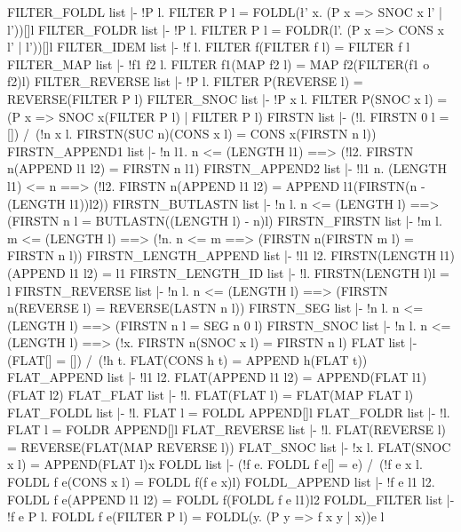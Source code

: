 \THEOREM FILTER\_FOLDL list
|- !P l. FILTER P l = FOLDL(\l' x. (P x => SNOC x l' | l'))[]l
\ENDTHEOREM
\THEOREM FILTER\_FOLDR list
|- !P l. FILTER P l = FOLDR(\x l'. (P x => CONS x l' | l'))[]l
\ENDTHEOREM
\THEOREM FILTER\_IDEM list
|- !f l. FILTER f(FILTER f l) = FILTER f l
\ENDTHEOREM
\THEOREM FILTER\_MAP list
|- !f1 f2 l. FILTER f1(MAP f2 l) = MAP f2(FILTER(f1 o f2)l)
\ENDTHEOREM
\THEOREM FILTER\_REVERSE list
|- !P l. FILTER P(REVERSE l) = REVERSE(FILTER P l)
\ENDTHEOREM
\THEOREM FILTER\_SNOC list
|- !P x l. FILTER P(SNOC x l) = (P x => SNOC x(FILTER P l) | FILTER P l)
\ENDTHEOREM
\THEOREM FIRSTN list
|- (!l. FIRSTN 0 l = []) /\
   (!n x l. FIRSTN(SUC n)(CONS x l) = CONS x(FIRSTN n l))
\ENDTHEOREM
\THEOREM FIRSTN\_APPEND1 list
|- !n l1.
    n <= (LENGTH l1) ==> (!l2. FIRSTN n(APPEND l1 l2) = FIRSTN n l1)
\ENDTHEOREM
\THEOREM FIRSTN\_APPEND2 list
|- !l1 n.
    (LENGTH l1) <= n ==>
    (!l2. FIRSTN n(APPEND l1 l2) = APPEND l1(FIRSTN(n - (LENGTH l1))l2))
\ENDTHEOREM
\THEOREM FIRSTN\_BUTLASTN list
|- !n l. n <= (LENGTH l) ==> (FIRSTN n l = BUTLASTN((LENGTH l) - n)l)
\ENDTHEOREM
\THEOREM FIRSTN\_FIRSTN list
|- !m l.
    m <= (LENGTH l) ==>
    (!n. n <= m ==> (FIRSTN n(FIRSTN m l) = FIRSTN n l))
\ENDTHEOREM
\THEOREM FIRSTN\_LENGTH\_APPEND list
|- !l1 l2. FIRSTN(LENGTH l1)(APPEND l1 l2) = l1
\ENDTHEOREM
\THEOREM FIRSTN\_LENGTH\_ID list
|- !l. FIRSTN(LENGTH l)l = l
\ENDTHEOREM
\THEOREM FIRSTN\_REVERSE list
|- !n l. n <= (LENGTH l) ==> (FIRSTN n(REVERSE l) = REVERSE(LASTN n l))
\ENDTHEOREM
\THEOREM FIRSTN\_SEG list
|- !n l. n <= (LENGTH l) ==> (FIRSTN n l = SEG n 0 l)
\ENDTHEOREM
\THEOREM FIRSTN\_SNOC list
|- !n l. n <= (LENGTH l) ==> (!x. FIRSTN n(SNOC x l) = FIRSTN n l)
\ENDTHEOREM
\THEOREM FLAT list
|- (FLAT[] = []) /\ (!h t. FLAT(CONS h t) = APPEND h(FLAT t))
\ENDTHEOREM
\THEOREM FLAT\_APPEND list
|- !l1 l2. FLAT(APPEND l1 l2) = APPEND(FLAT l1)(FLAT l2)
\ENDTHEOREM
\THEOREM FLAT\_FLAT list
|- !l. FLAT(FLAT l) = FLAT(MAP FLAT l)
\ENDTHEOREM
\THEOREM FLAT\_FOLDL list
|- !l. FLAT l = FOLDL APPEND[]l
\ENDTHEOREM
\THEOREM FLAT\_FOLDR list
|- !l. FLAT l = FOLDR APPEND[]l
\ENDTHEOREM
\THEOREM FLAT\_REVERSE list
|- !l. FLAT(REVERSE l) = REVERSE(FLAT(MAP REVERSE l))
\ENDTHEOREM
\THEOREM FLAT\_SNOC list
|- !x l. FLAT(SNOC x l) = APPEND(FLAT l)x
\ENDTHEOREM
\THEOREM FOLDL list
|- (!f e. FOLDL f e[] = e) /\
   (!f e x l. FOLDL f e(CONS x l) = FOLDL f(f e x)l)
\ENDTHEOREM
\THEOREM FOLDL\_APPEND list
|- !f e l1 l2. FOLDL f e(APPEND l1 l2) = FOLDL f(FOLDL f e l1)l2
\ENDTHEOREM
\THEOREM FOLDL\_FILTER list
|- !f e P l. FOLDL f e(FILTER P l) = FOLDL(\x y. (P y => f x y | x))e l
